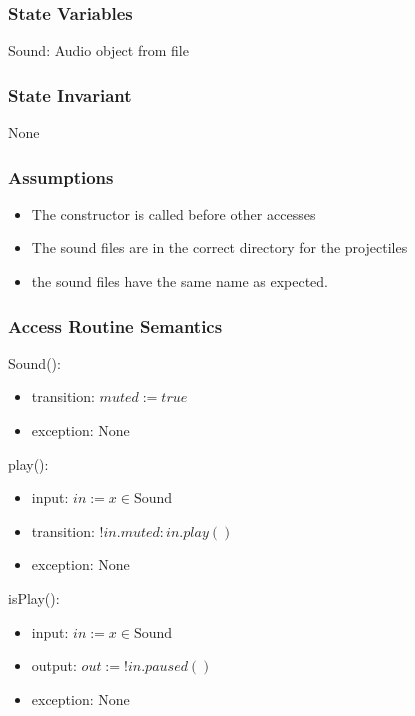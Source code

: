 \documentclass[12pt]{article}
\begin{document}
\subsubsection* {State Variables}

Sound: Audio object from file

\subsubsection* {State Invariant}

None

\subsubsection* {Assumptions}

\begin{itemize}
    \item The constructor is called before other accesses
    \item The sound files are in the correct directory for the projectiles
    \item the sound files have the same name as expected.
\end{itemize}

\subsubsection* {Access Routine Semantics}

Sound():
\begin{itemize}
  \item transition: $muted := true$
  \item exception: None
\end{itemize}

\noindent play():
\begin{itemize}
  \item input: $in := x \in \mbox{Sound}$
  \item transition: $!in.muted: in.play()$
  \item exception: None
\end{itemize}

\noindent isPlay():
\begin{itemize}
  \item input: $in := x \in \mbox{Sound}$
  \item output: $out := !in.paused()$
  \item exception: None
\end{itemize}
\end{document}
